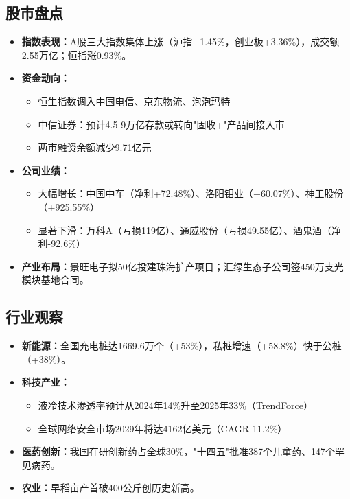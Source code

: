 \subsection{股市盘点}
\begin{itemize}
    \item \textbf{指数表现：}A股三大指数集体上涨（沪指+1.45\%，创业板+3.36\%），成交额2.55万亿；恒指涨0.93\%。
    \item \textbf{资金动向：}
    \begin{itemize}
        \item 恒生指数调入中国电信、京东物流、泡泡玛特
        \item 中信证券：预计4.5-9万亿存款或转向"固收+"产品间接入市
        \item 两市融资余额减少9.71亿元
    \end{itemize}
    \item \textbf{公司业绩：}
    
\begin{itemize}
        \item 大幅增长：中国中车（净利+72.48\%）、洛阳钼业（+60.07\%）、神工股份（+925.55\%）
        \item 显著下滑：万科A（亏损119亿）、通威股份（亏损49.55亿）、酒鬼酒（净利-92.6\%）
    \end{itemize}
    \item \textbf{产业布局：}景旺电子拟50亿投建珠海扩产项目；汇绿生态子公司签450万支光模块基地合同。
\end{itemize}

\subsection{行业观察}
\begin{itemize}
    \item \textbf{新能源：}全国充电桩达1669.6万个（+53\%），私桩增速（+58.8\%）快于公桩（+38\%）。
    \item \textbf{科技产业：}
    \begin{itemize}
        \item 液冷技术渗透率预计从2024年14\%升至2025年33\%（TrendForce）
        \item 全球网络安全市场2029年将达4162亿美元（CAGR 11.2\%）
    \end{itemize}
    \item \textbf{医药创新：}我国在研创新药占全球30\%，"十四五"批准387个儿童药、147个罕见病药。
    \item \textbf{农业：}早稻亩产首破400公斤创历史新高。
\end{itemize}

